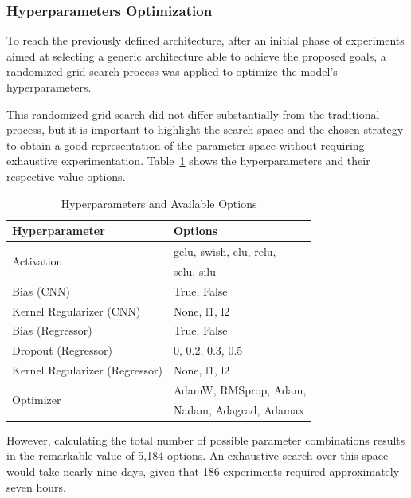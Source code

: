 \documentclass[10pt,conference]{IEEEtran}
\begin{document}
\subsubsection{Hyperparameters Optimization}

To reach the previously defined architecture, after an initial phase of experiments aimed at selecting a generic architecture able to achieve the proposed goals, a randomized grid search process was applied to optimize the model’s hyperparameters.

This randomized grid search did not differ substantially from the traditional process, but it is important to highlight the search space and the chosen strategy to obtain a good representation of the parameter space without requiring exhaustive experimentation. Table~\ref{tab:hyperparams_options} shows the hyperparameters and their respective value options.


\begin{table} \small \centering
  \caption{Hyperparameters and Available Options}
  \label{tab:hyperparams_options}
\begin{tabular*}{\columnwidth}
    {@{\extracolsep{\fill}}ll}
    \toprule
    Hyperparameter & Options \\
    \midrule
    \multirow{2}{*}{Activation} & gelu, swish, elu, relu,  \\
    & selu, silu \\
    Bias (CNN) & True, False \\
    Kernel Regularizer (CNN) & None, l1, l2 \\
    Bias (Regressor) & True, False \\
    Dropout (Regressor) & 0, 0.2, 0.3, 0.5 \\
    Kernel Regularizer (Regressor) & None, l1, l2 \\
    \multirow{2}{*}{Optimizer} & AdamW, RMSprop, Adam, \\
    & Nadam, Adagrad, Adamax \\
    \bottomrule
  \end{tabular*}
\end{table}

However, calculating the total number of possible parameter combinations results in the remarkable value of 5,184 options. An exhaustive search over this space would take nearly nine days, given that 186 experiments required approximately seven hours.
\end{document}
